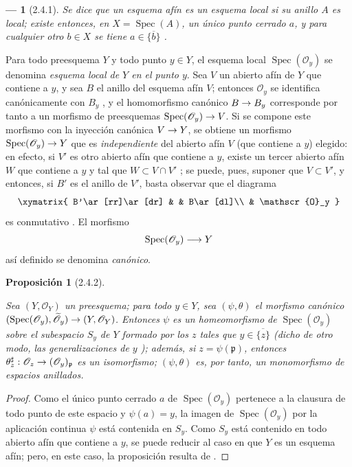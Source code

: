 \documentclass[oneside]{amsart}
\theoremstyle{ega-env-style}
\newtheorem*{env}{---}
\theoremstyle{ega-thm-env-style}
\newtheorem*{proposition}{Proposición}
\theoremstyle{ega-defn-env-style}
\renewcommand{\to}{\mathchoice{\longrightarrow}{\rightarrow}{\rightarrow}{\rightarrow}}
\newcommand{\oldpage}[2][]{{\marginnote{\normalfont{\textbf{#1}~|~#2}}}\ignorespaces}
\let\EGAOriginalLabel\label
\renewcommand{\label}[1]{\phantomsection\EGAOriginalLabel{#1}}
\begin{document}
\begin{env}[2.4.1]
\label{I.2.4.1}
Se dice que un esquema afín es un \emph{esquema local} si su anillo $A$ es local;
existe entonces, en $X=\operatorname{Spec}(A)$, un único \emph{punto cerrado $a$}, y para cualquier otro $b\in X$ se tiene $a\in\overline{\{b\}}$ .
\end{env}

Para todo preesquema $Y$ y todo punto $y\in Y$, el esquema local $\operatorname{Spec}(\mathscr{O}_y)$
se denomina \emph{esquema local de $Y$ en el punto $y$}.
Sea $V$ un abierto afín de $Y$ que contiene a $y$, y sea $B$ el anillo del esquema afín $V$;
entonces $\mathscr{O}_y$ se identifica canónicamente con $B_y$ , y el homomorfismo canónico $B\to B_y$ corresponde por tanto  a un morfismo de preesquemas $\operatorname{Spec}(\mathscr{O}_y)\to V$.
Si se compone este morfismo con la inyección canónica $V\to Y$, se obtiene un morfismo $\operatorname{Spec}(\mathscr{O}_y)\to Y$ que es \emph{independiente} del abierto afín $V$ (que contiene a $y$) elegido: en efecto, si $V'$ es otro abierto afín que contiene a $y$, existe un tercer abierto afín $W$ que contiene a $y$ y tal que $W\subset V\cap V'$ ;
se puede, pues, suponer que $V\subset V'$, y entonces, si $B'$ es el anillo de $V'$, basta observar que el diagrama
\label{I.2.4.1.diagram-fr}
\[
  \xymatrix{
    B'\ar[rr]\ar[dr] & & B\ar[dl]\\
    & \mathscr{O}_y
  }
\]
es conmutativo .
El morfismo
\[
  \operatorname{Spec}(\mathscr{O}_y)\to Y
\]
así definido se denomina {\it canónico}.


\oldpage[I]{102}
\begin{proposition}[2.4.2]
\label{I.2.4.2}

Sea $(Y,\mathscr{O}_Y)$ un preesquema;
para todo $y\in Y$, sea $(\psi,\theta)$ el morfismo canónico $(\operatorname{Spec}(\mathscr{O}_y),\widetilde{\mathscr{O}}_y)
\to(Y,\mathscr{O}_Y)$.
Entonces $\psi$ es un homeomorfismo de $\operatorname{Spec}(\mathscr{O}_y)$ sobre el subespacio $S_y$ de $Y$ formado por los $z$ tales que $y\in\overline{\{z\}}$ \textup{(dicho de otro modo, las} generalizaciones \textup{de} $y$ \textup{)};
además, si $z=\psi(\mathfrak{p})$, entonces $\theta_z^{\sharp}:\mathscr{O}_z\to(\mathscr{O}_y)_{\mathfrak{p}}$ es un isomorfismo;
$(\psi,\theta)$ es, por tanto, un monomorfismo de espacios anillados.
\end{proposition}

\begin{proof}
Como el único punto cerrado $a$ de $\operatorname{Spec}(\mathscr{O}_y)$ pertenece a la clausura de todo punto de este espacio y $\psi(a)=y$, la imagen de $\operatorname{Spec}(\mathscr{O}_y)$ por la aplicación continua $\psi$ está contenida en $S_y$.
Como $S_y$ está contenido en todo abierto afín que contiene a $y$, se puede reducir al caso en que $Y$ es un esquema afín;
pero, en este caso, la proposición resulta de .
\end{proof}
\end{document}
